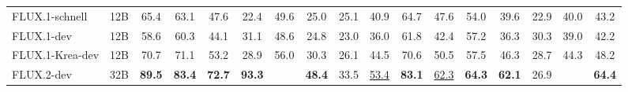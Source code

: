 \begin{table}[t]
{\begin{tabular}{lcccccccccccccccc}
FLUX.1-schnell                   & 12B                                & 65.4                                 & 63.1                                 & 47.6                                 & 22.4                                 & \cellcolor[HTML]{E2E2E2}49.6                                 & 25.0                                 & 25.1                                 & 40.9                                 & 64.7                                 & 47.6                                 & 54.0                                 & 39.6                                 & 22.9                                 & \cellcolor[HTML]{E2E2E2}40.0                                 & 43.2                                 \\
FLUX.1-dev                       & 12B                                & 58.6                                 & 60.3                                 & 44.1                                 & 31.1                                 & \cellcolor[HTML]{E2E2E2}48.6                                 & 24.8                                 & 23.0                                 & 36.0                                 & 61.8                                 & 42.4                                 & 57.2                                 & 36.3                                 & 30.3                                 & \cellcolor[HTML]{E2E2E2}39.0                                 & 42.2                                 \\
FLUX.1-Krea-dev                  & 12B                                & 70.7                                 & 71.1                                 & 53.2                                 & 28.9                                 & \cellcolor[HTML]{E2E2E2}56.0                                 & 30.3                                 & 26.1                                 & 44.5                                 & 70.6                                 & 50.5                                 & 57.5                                 & 46.3                                 & 28.7                                 & \cellcolor[HTML]{E2E2E2}44.3                                 & 48.2                                 \\
FLUX.2-dev                       & 32B                                & {\color[HTML]{F88825} \textbf{89.5}} & {\color[HTML]{F88825} \textbf{83.4}} & {\color[HTML]{F88825} \textbf{72.7}} & {\color[HTML]{F88825} \textbf{93.3}} & \cellcolor[HTML]{E2E2E2}{\color[HTML]{F88825} \textbf{84.7}} & {\color[HTML]{F88825} \textbf{48.4}} & 33.5                                 & {\color[HTML]{F88825} \underline{53.4}}    & {\color[HTML]{F88825} \textbf{83.1}} & {\color[HTML]{F88825} \underline{62.3}}    & {\color[HTML]{F88825} \textbf{64.3}} & {\color[HTML]{F88825} \textbf{62.1}} & 26.9                                 & \cellcolor[HTML]{E2E2E2}{\color[HTML]{F88825} \textbf{54.2}} & {\color[HTML]{F88825} \textbf{64.4}} \\

\end{tabular}}
\end{table}
